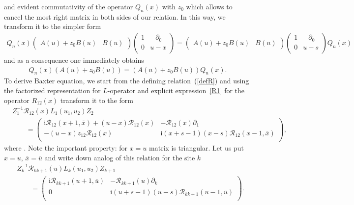 \documentclass[10pt,a4paper]{amsart}
\renewcommand{\imath}{\mathrm{i}}
\numberwithin{equation}{section}
\begin{document}
and evident commutativity of the operator $Q_n( x)$
with $z_0$ which allows to cancel the most right matrix
in both sides of our relation.
In this way, we transform it to the simpler form
\begin{align*}
Q_n(x)
\begin{pmatrix}
A(u)+z_0 B(u) & B(u)
\end{pmatrix}
\begin{pmatrix}
 1 & -\partial_{0} \\
 0 & u-x \\
\end{pmatrix}
 = \begin{pmatrix}
A(u)+z_0 B(u) & B(u)
\end{pmatrix}
\begin{pmatrix}
 1 & -\partial_{0} \\
 0 & u-s \\
\end{pmatrix}
Q_n(x)
\end{align*}
and as a consequence one immediately obtains
\begin{align*}
Q_n(x)
(A(u)+z_0 B(u))
= (A(u)+z_0 B(u))
Q_n(x) .
\end{align*}
To derive Baxter equation, we start from the
defining relation~(\ref{defR}) and using the factorized representation for $L$-operator and explicit expression~\eqref{R1} for the operator $R_{12}( x)$
transform it to the form
\begin{align*}
&
Z_1^{-1}
\mathcal{R}_{12}(x) L_1(u_1,u_2) Z_2 \\
&\qquad{}
=
\begin{pmatrix}
\imath\mathcal{R}_{12}(x+1,\bar{x}) +
(u-x)\mathcal{R}_{12}( x) & -\mathcal{R}_{12}( x)\partial_{1} \\
-(u-x) z_{12} \mathcal{R}_{12}( x) & \imath(x+s-1)(x-s)
\mathcal{R}_{12}(x-1,\bar{x}) \\
\end{pmatrix},
\end{align*}
where .
Note the important property: for $x=u$ matrix is triangular.
Let us put ${x=u}$, ${\bar{x}=\bar{u}}$ and write down analog of
this relation for the site $k$
\begin{align*}
& Z^{-1}_k \mathcal{R}_{k k+1}( u)
 L_k(u_1,u_2) Z_{k+1} \\
& \qquad{} =
\begin{pmatrix}
\imath\mathcal{R}_{k k+1}(u+1,\bar{u}) & -\mathcal{R}_{k k+1}( u)\partial_{k} \\
 0 & \imath(u+s-1)(u-s) \mathcal{R}_{k k+1}(u-1,\bar{u}) \\
\end{pmatrix}.
\end{align*}
\end{document}
